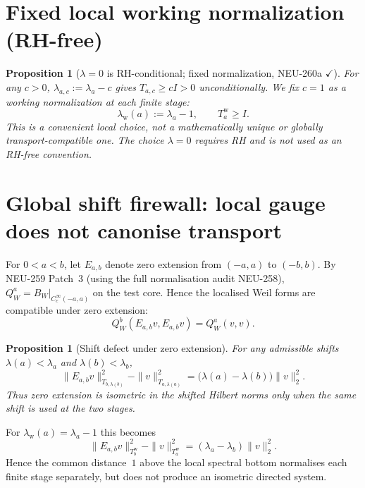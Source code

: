 \documentclass[11pt,a4paper]{amsart}
\newtheorem{proposition}[theorem]{Proposition}
\begin{document}
\section{Fixed local working normalization (RH-free)}

\begin{proposition}[$\lambda=0$ is RH-conditional; fixed normalization, NEU-260a $\checkmark$]
For any $c>0$, $\lambda_{a,c}:=\lambda_a-c$ gives $T_{a,c}\ge cI>0$
unconditionally. We fix $c=1$ as a working normalization at each finite stage:
\[
  \lambda_{\mathrm{w}}(a) := \lambda_a-1, \qquad T_a^{\mathrm{w}} \ge I.
\]
This is a convenient local choice, not a mathematically unique or globally
transport-compatible one. The choice $\lambda=0$ requires RH and is not used
as an RH-free convention.
\end{proposition}

\section{Global shift firewall: local gauge does not canonise transport}

For $0<a<b$, let $E_{a,b}$ denote zero extension from $(-a,a)$ to $(-b,b)$.
By NEU-259 Patch~3 (using the full normalisation audit NEU-258),
$Q_W^a=B_W|_{C_c^\infty(-a,a)}$ on the test core. Hence the localised Weil
forms are compatible under zero extension:
\[
  Q_W^b(E_{a,b}v,E_{a,b}v)=Q_W^a(v,v).
\]

\begin{proposition}[Shift defect under zero extension]\label{prop:shift-defect}
For any admissible shifts $\lambda(a)<\lambda_a$ and $\lambda(b)<\lambda_b$,
\[
  \boxed{
  \|E_{a,b}v\|_{T_{b,\lambda(b)}}^2
  -
  \|v\|_{T_{a,\lambda(a)}}^2
  =
  \bigl(\lambda(a)-\lambda(b)\bigr)\|v\|_2^2.}
\]
Thus zero extension is isometric in the shifted Hilbert norms only when the
same shift is used at the two stages.
\end{proposition}

For $\lambda_{\mathrm w}(a)=\lambda_a-1$ this becomes
\[
  \boxed{
  \|E_{a,b}v\|_{T_b^{\mathrm w}}^2
  -
  \|v\|_{T_a^{\mathrm w}}^2
  =
  (\lambda_a-\lambda_b)\|v\|_2^2.}
\]
Hence the common distance~$1$ above the local spectral bottom normalises each
finite stage separately, but does not produce an isometric directed system.
\end{document}
